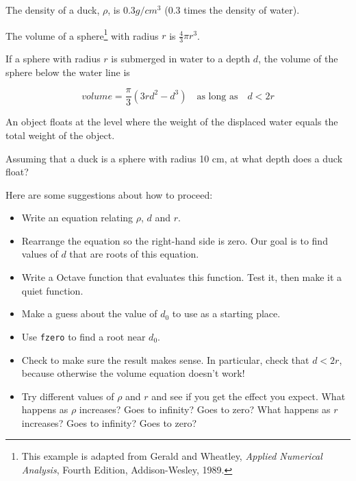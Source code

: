 \documentclass{book}
\begin{document}
\begin{ex}
\label{duck}

The density of a duck, $\rho$, is $0.3 g / cm^3$ (0.3 times the
density of water).

The volume of a sphere\footnote{This example is adapted from Gerald
and Wheatley, {\em Applied Numerical Analysis}, Fourth Edition,
Addison-Wesley, 1989.} with radius $r$ is $\frac{4}{3} \pi r^3$.

If a sphere with radius $r$ is submerged in water to a depth $d$, the
volume of the sphere below the water line is 

\[ volume = \frac{\pi}{3} (3r d^2 - d^3) \quad 
\mbox{as long as} \quad d < 2 r \]

An object floats at the level where the weight of the displaced water
equals the total weight of the object.

Assuming that a duck is a sphere with radius 10 cm, at what depth does
a duck float?

Here are some suggestions about how to proceed:

\begin{itemize}

\item Write an equation relating $\rho$, $d$ and $r$.

\item Rearrange the equation so the right-hand side is zero.
Our goal is to find values of $d$ that are roots of this equation.

\item Write a Octave function that evaluates this function. Test it,
  then make it a quiet function.

\item Make a guess about the value of $d_0$ to use as a starting place.

\item Use {\tt fzero} to find a root near $d_0$.

\item Check to make sure the result makes sense. In particular,
  check that $d < 2 r$, because otherwise the volume equation
  doesn't work!

\item Try different values of $\rho$ and $r$ and see if you get the
effect you expect. What happens as $\rho$ increases? Goes to
infinity? Goes to zero? What happens as $r$ increases? Goes to
infinity? Goes to zero?

\end{itemize}


\end{ex}
\end{document}

